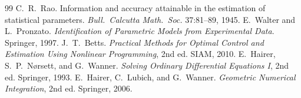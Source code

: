 \begin{thebibliography}{99}
 C.~R.~Rao. Information and accuracy attainable in the
  estimation of statistical parameters. \textit{Bull.\ Calcutta Math.\
  Soc.} 37:81--89, 1945.
 E.~Walter and L.~Pronzato. \textit{Identification of
  Parametric Models from Experimental Data}. Springer, 1997.
 J.~T.~Betts. \textit{Practical Methods for Optimal
  Control and Estimation Using Nonlinear Programming}, 2nd ed. SIAM, 2010.
\bibitem{hairer1993} E.~Hairer, S.~P.~N{\o}rsett, and G.~Wanner.
  \textit{Solving Ordinary Differential Equations I}, 2nd ed. Springer,
  1993.
 E.~Hairer, C.~Lubich, and G.~Wanner. \textit{Geometric
  Numerical Integration}, 2nd ed. Springer, 2006.

\end{thebibliography}
